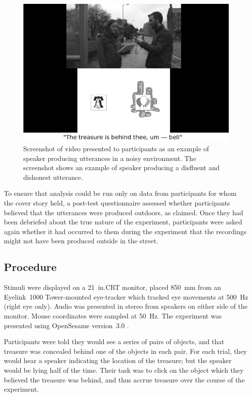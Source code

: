 \documentclass[a4paper,man,natbib]{apa6}
\begin{document}
\begin{figure}[Ht]
  \centering
	\includegraphics[scale=.2]{convincer.png}
  \caption{Screenshot of video presented to participants as an example of speaker producing utterances in a noisy environment. The screenshot shows an example of speaker producing a disfluent and dishonest utterance.}
  \label{fig:vid}
\end{figure}


To ensure that analysis could be run only on data from participants for whom the cover story held, a post-test questionnaire assessed whether participants believed that the utterances were produced outdoors, as claimed.
Once they had been debriefed about the true nature of the experiment, participants were asked again whether it had occurred to them during the experiment that the recordings might not have been produced outside in the street.

\subsection{Procedure}
Stimuli were displayed on a 21~in.\@ CRT monitor, placed 850~mm from an Eyelink~1000 Tower-mounted eye-tracker which tracked eye movements at 500~Hz (right eye only). 
Audio was presented in stereo from speakers on either side of the monitor. 
Mouse coordinates were sampled at 50~Hz. 
The experiment was presented using OpenSesame version~3.0 \citep{Mathot2012}.


Participants were told they would see a series of pairs of objects, and that treasure was concealed behind one of the objects in each pair.
For each trial, they would hear a speaker indicating the location of the treasure; but the speaker would be lying half of the time.
Their task was to click on the object which they believed the treasure was behind, and thus accrue treasure over the course of the experiment.
\end{document}
